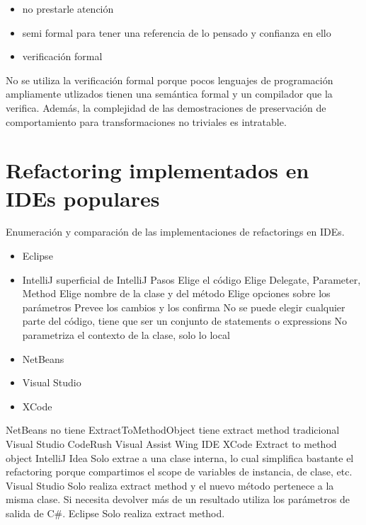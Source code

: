 \begin{itemize}
    \item no prestarle atención
    \item semi formal para tener una referencia de lo pensado y confianza en ello
    \item verificación formal
\end{itemize}

No se utiliza la verificación formal porque pocos lenguajes de programación ampliamente utlizados
tienen una semántica formal y un compilador que la verifica. Además, la complejidad de las
demostraciones de preservación de comportamiento para transformaciones no triviales es intratable.

\section{Refactoring implementados en IDEs populares}
Enumeración y comparación de  las implementaciones de refactorings en IDEs.

\begin{itemize}
    \item Eclipse
    \item IntelliJ
    superficial de IntelliJ Pasos Elige el código Elige Delegate, Parameter, Method Elige nombre de la
    clase y del método Elige opciones sobre los parámetros Prevee los cambios y los confirma No se puede
    elegir cualquier parte del código, tiene que ser un conjunto de statements o expressions No
    parametriza el contexto de la clase, solo lo local
    \item NetBeans
    \item Visual Studio
    \item XCode
\end{itemize}
 NetBeans no tiene ExtractToMethodObject tiene
extract method tradicional Visual Studio CodeRush Visual Assist Wing IDE XCode Extract to method
object IntelliJ Idea Solo extrae a una clase interna, lo cual simplifica bastante el refactoring
porque compartimos el scope de variables de instancia, de clase, etc. Visual Studio Solo realiza
extract method y el nuevo método pertenece a la misma clase. Si necesita devolver más de un
resultado utiliza los parámetros de salida de C\#. Eclipse Solo realiza extract method.